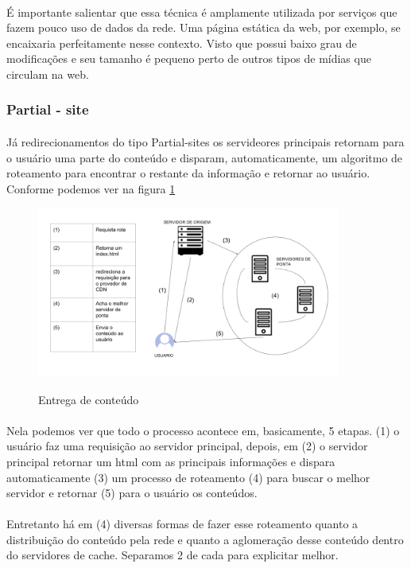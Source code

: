 \paragraph{} \'E importante salientar que essa t\'ecnica \'e amplamente utilizada por servi\c{c}os que fazem pouco uso de dados da rede. Uma p\'agina est\'atica da web, por exemplo, se encaixaria perfeitamente nesse contexto. Visto que possui baixo grau de modifica\c{c}\~oes e seu tamanho \'e pequeno perto de outros tipos de m\'idias que circulam na web.

\subsubsection{Partial - site}
\paragraph{} J\'a redirecionamentos do tipo Partial-sites os servideores principais retornam para o usu\'ario uma parte do conte\'udo e disparam, automaticamente, um algoritmo de roteamento para encontrar o restante da informa\c{c}\~ao e retornar ao usu\'ario. Conforme podemos ver na figura \ref{figura:entrega_conteudo}
\begin{figure}[h]
\caption{Entrega de conte\'udo}
\includegraphics[width=10cm]{Figuras/entrega_conteudo.png} 
\label{figura:entrega_conteudo}
\end{figure}
\paragraph{}  Nela podemos ver que todo o processo acontece em, basicamente, 5 etapas. (1) o usu\'ario faz uma requisi\c{c}\~ao ao servidor principal, depois, em (2) o servidor principal retornar um html com as principais informa\c{c}\~oes e dispara automaticamente (3) um processo de roteamento (4) para buscar o melhor servidor e retornar (5) para o usu\'ario os conte\'udos.
\paragraph{} Entretanto h\'a em (4) diversas formas de fazer esse roteamento quanto a distribui\c{c}\~ao do conte\'udo pela rede e quanto a aglomera\c{c}\~ao desse conte\'udo dentro do servidores de cache. Separamos 2 de cada para explicitar melhor.

